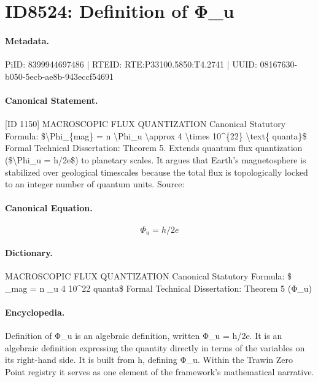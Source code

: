 \section*{ID8524: Definition of Φ\_u}
\paragraph{Metadata.}
PiID: 8399944697486 | RTEID: RTE:P33100.5850:T4.2741 | UUID: 08167630-b050-5ecb-ae8b-943eccf54691

\paragraph{Canonical Statement.}
[ID 1150] MACROSCOPIC FLUX QUANTIZATION Canonical Statutory Formula: \$\textbackslash{}Phi\_\{mag\} = n \textbackslash{}Phi\_u \textbackslash{}approx 4 \textbackslash{}times 10\textasciicircum{}\{22\} \textbackslash{}text\{ quanta\}\$ Formal Technical Dissertation: Theorem 5. Extends quantum flux quantization (\$\textbackslash{}Phi\_u = h/2e\$) to planetary scales. It argues that Earth's magnetosphere is stabilized over geological timescales because the total flux is topologically locked to an integer number of quantum units. Source:

\paragraph{Canonical Equation.}
\[
\Phi_u = h/2e
\]

\paragraph{Dictionary.}
MACROSCOPIC FLUX QUANTIZATION Canonical Statutory Formula: \$ \_mag = n \_u 4 10\textasciicircum{}22 quanta\$ Formal Technical Dissertation: Theorem 5 (Φ\_u)

\paragraph{Encyclopedia.}
Definition of Φ\_u is an algebraic definition, written Φ\_u = h/2e. It is an algebraic definition expressing the quantity directly in terms of the variables on its right-hand side. It is built from h, defining Φ\_u. Within the Trawin Zero Point registry it serves as one element of the framework's mathematical narrative.
